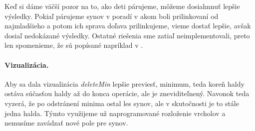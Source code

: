 Keď si dáme väčší pozor na to, ako deti párujeme, môžeme dosiahnnuť lepšie výsledky. Pokiaľ párujeme synov v poradí v akom boli prilinkovaní od najmladšieho a potom ich sprava doľava prilinkujeme, vieme dostať lepšie, avšak dosiaľ nedokázané výsledky.
Ostatné riešenia sme zatiaľ neimplementovali, preto len spomenieme, že sú popísané napríklad v \cite{pairing}.


\paragraph{Vizualizácia.}
Aby sa dala vizualizácia \emph{deleteMin} lepšie previesť, minimum, teda koreň haldy ostáva súčasťou haldy až do konca operácie, ale je zneviditeľnený. Navonok teda vyzerá, že po odstránení minima ostal les synov, ale v skutočnosti je to stále jedna halda. Týmto využijeme už naprogramované rozloženie vrcholov a nemusíme zavádzať nové pole pre synov.
